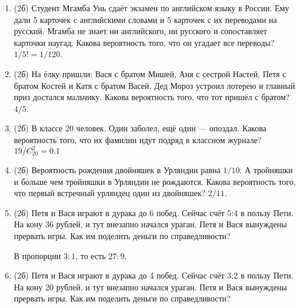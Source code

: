 \documentclass[a4paper, 12pt]{article}
\begin{document}
\newpage
\begin{enumerate}
  \item (2б) Студент Мгамба Унь сдаёт экзамен по английском языку в России. Ему дали 5 карточек с английскими словами и 5 карточек с их переводами на русский. Мгамба не знает ни английского, ни русского и сопоставляет карточки наугад. Какова вероятность того, что он угадает все переводы? $1/5!=1/120$.
  \item (2б) На ёлку пришли: Вася с братом Мишей, Аня с сестрой Настей, Петя с братом Костей и Катя с братом Васей. Дед Мороз устроил лотерею и главный приз достался мальчику. Какова вероятность того, что тот пришёл с братом? $4/5$.
  \item (2б) В классе 20 человек. Один заболел, ещё один — опоздал. Какова вероятность того, что их фамилии идут подряд в классном журнале? $19/C_{20}^2=0.1$
  \item (2б) Вероятность рождения двойняшек в Урляндии равна $1/10$. А тройняшки и больше чем тройняшки в Урляндии не рождаются. Какова вероятность того, что первый встречный урляндец один из двойняшек? $2/11$.
  \item (2б) Петя и Вася играют в дурака до 6 побед. Сейчас счёт 5:4 в пользу Пети. На кону 36 рублей, и тут внезапно начался ураган. Петя и Вася вынуждены прервать игры. Как им поделить деньги по справедливости?

  В пропорции $3:1$, то есть $27:9$.

  \item (2б) Петя и Вася играют в дурака до 4 побед. Сейчас счёт 3:2 в пользу Пети. На кону 20 рублей, и тут внезапно начался ураган. Петя и Вася вынуждены прервать игры. Как им поделить деньги по справедливости?


\end{enumerate}
\end{document}

